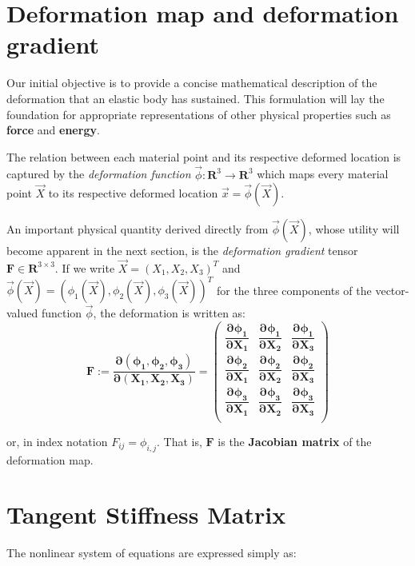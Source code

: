 \section{Deformation map and deformation gradient}
Our initial objective is to provide a concise mathematical description of the deformation that an elastic body has sustained. This formulation will lay the foundation for appropriate representations of other physical properties such as \textbf{force} and \textbf{energy}.

The relation between each material point and its respective deformed location is captured by the \textit{deformation function} $ \vec{\phi}: \mathbf{R}^3 \rightarrow \mathbf{R}^3 $ which maps every material point $ \vec{X} $ to its respective deformed location $ \vec{x}=\vec{\phi} (\vec{X}) $.

An important physical quantity derived directly from $ \vec{\phi} (\vec{X}) $, whose utility will become apparent in the next section, is the \textit{deformation gradient} tensor $ \mathbf{F} \in \mathbf{R}^{3\times 3} $. If we write $ \vec{X}=(X_1,X_2,X_3)^T $ and $ \vec{\phi} (\vec{X}) = \left( \phi _1(\vec{X}),\phi _2(\vec{X}), \phi _3(\vec{X}) \right)^T $ for the three components of the vector-valued function $ \vec{\phi} $, the deformation is written as:
\begin{equation}
	\mathbf{F:=\dfrac{\partial (\phi _1,\phi _2, \phi _3)}{\partial (X_1, X_2,X_3)}=\left( 
		\begin{matrix}
			\dfrac{\partial \phi _1}{\partial X_1} & \dfrac{\partial \phi _1}{\partial X_2} & \dfrac{\partial \phi _1}{\partial X_3}\\
			\dfrac{\partial \phi _2}{\partial X_1} & \dfrac{\partial \phi _2}{\partial X_2} & \dfrac{\partial \phi _2}{\partial X_3}\\
			\dfrac{\partial \phi _3}{\partial X_1} & \dfrac{\partial \phi _3}{\partial X_2} & \dfrac{\partial \phi _3}{\partial X_3}\\
		\end{matrix} \right)}
\end{equation}

or, in index notation $ F_{ij}=\phi _{i,j} $. That is, $ \mathbf{F} $ is the \textbf{Jacobian matrix} of the deformation map.

\section{Tangent Stiffness Matrix}
The nonlinear system of equations are expressed simply as:

